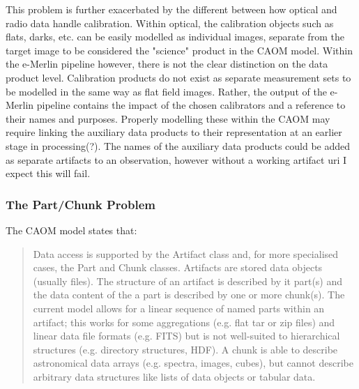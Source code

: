 This problem is further exacerbated by the different between how optical and radio data handle calibration.
Within optical, the calibration objects such as flats, darks, etc. can be easily modelled as individual images, separate from the target image to be considered the "science" product in the CAOM model.
Within the e-Merlin pipeline however, there is not the clear distinction on the data product level. 
Calibration products do not exist as separate measurement sets to be modelled in the same way as flat field images.
Rather, the output of the e-Merlin pipeline contains the impact of the chosen calibrators and a reference to their names and purposes. 
Properly modelling these within the CAOM may require linking the auxiliary data products to their representation at an earlier stage in processing(?). 
The names of the auxiliary data products could be added as separate artifacts to an observation, however without a working artifact uri I expect this will fail. 

\subsubsection{The Part/Chunk Problem}

The CAOM model states that:

\begin{quote}
    Data access is supported by the Artifact class and, for more specialised cases, the Part and Chunk classes. Artifacts are stored data objects (usually files). The structure of an artifact is described by it part(s) and the data content of the a part is described by one or more chunk(s). The current model allows for a linear sequence of named parts within an artifact; this works for some aggregations (e.g. flat tar or zip files) and linear data file formats (e.g. FITS) but is not well-suited to hierarchical structures (e.g. directory structures, HDF). A chunk is able to describe astronomical data arrays (e.g. spectra, images, cubes), but cannot describe arbitrary data structures like lists of data objects or tabular data. 
\end{quote}

